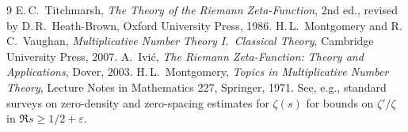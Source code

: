 \documentclass[11pt]{article}
\theoremstyle{plain}
\theoremstyle{definition}
\begin{document}
\begin{thebibliography}{9}
 E.\,C.~Titchmarsh, \emph{The Theory of the Riemann Zeta-Function}, 2nd ed., revised by D.\,R.~Heath-Brown, Oxford University Press, 1986.
 H.\,L.~Montgomery and R.\,C.~Vaughan, \emph{Multiplicative Number Theory I.~Classical Theory}, Cambridge University Press, 2007.
 A.~Ivi\'c, \emph{The Riemann Zeta-Function: Theory and Applications}, Dover, 2003.
 H.\,L.~Montgomery, \emph{Topics in Multiplicative Number Theory}, Lecture Notes in Mathematics 227, Springer, 1971.
 See, e.g., standard surveys on zero-density and zero-spacing estimates for $\zeta(s)$ for bounds on $\zeta'/\zeta$ in $\Re s \ge 1/2+\varepsilon$.
\end{thebibliography}
\end{document}
